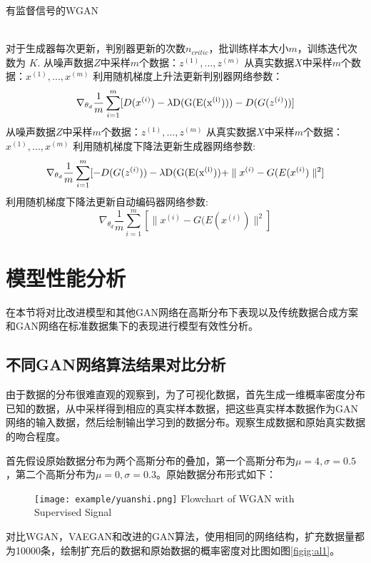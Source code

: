 \begin{algorithm}[htpb]
	\caption{有监督信号的WGAN}%
	\begin{algorithmic}[1]%
		\Require ~~ \\
		对于生成器每次更新，判别器更新的次数$n_{critic}$，批训练样本大小$m$，训练迭代次数为 $K$.
		\State 从噪声数据$Z$中采样$m$个数据：${z^{(1)},...,z^{(m)}}$
		\State 从真实数据$X$中采样$m$个数据：${x^{(1)},...,x^{(m)}}$ 
		\State 利用随机梯度上升法更新判别器网络参数：
		\begin{equation*}
		\nabla_{\theta_{d}}\frac{1}{m}\sum_{i=1}^m[D(x^{(i)})-\lambda {\rm{D(G(E(x^{(i)})))}}-D(G(z^{(i)}))]  
		\end{equation*}
		\EndFor
		\State 从噪声数据$Z$中采样$m$个数据：${z^{(1)},...,z^{(m)}}$
		\State 从真实数据$X$中采样$m$个数据：${x^{(1)},...,x^{(m)}}$
		\State 利用随机梯度下降法更新生成器网络参数:
		\begin{equation*}
		\nabla_{\theta_{d}}\frac{1}{m}\sum_{i=1}^m[-D(G(z^{(i)}))-\lambda {\rm{D(G(E(x^{(i)}))}}+\parallel x^{(i)}-G(E(x^{(i)})\parallel^{2}]
		\end{equation*}
		\State 利用随机梯度下降法更新自动编码器网络参数:
		\begin{equation*}
		\nabla_{\theta_{d}}\frac{1}{m}\sum_{i=1}^m[\parallel x^{(i)}-G(E(x^{(i)})\parallel^{2}]
		\end{equation*}
		\EndFor
	\end{algorithmic}
\end{algorithm}
\section{模型性能分析}
在本节将对比改进模型和其他GAN网络在高斯分布下表现以及传统数据合成方案和GAN网络在标准数据集下的表现进行模型有效性分析。
\subsection{不同GAN网络算法结果对比分析}
由于数据的分布很难直观的观察到，为了可视化数据，首先生成一维概率密度分布已知的数据，从中采样得到相应的真实样本数据，把这些真实样本数据作为GAN网络的输入数据，然后绘制输出学习到的数据分布。观察生成数据和原始真实数据的吻合程度。

首先假设原始数据分布为两个高斯分布的叠加，第一个高斯分布为$\mu=4,\sigma=0.5$，第二个高斯分布为$\mu=0,\sigma=0.3$。原始数据分布形式如下：
\begin{figure}[htbp]
	\centering
	\texttt{[image: example/yuanshi.png]}
	{Flowchart of WGAN with Supervised Signal}
	\label{figyuanshi}
\end{figure}
对比WGAN，VAEGAN和改进的GAN算法，使用相同的网络结构，扩充数据量都为10000条，绘制扩充后的数据和原始数据的概率密度对比图如图\ref{figig:al1}。

